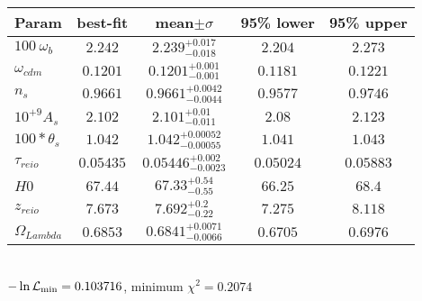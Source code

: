 \begin{tabular}{|l|c|c|c|c|} 
 \hline 
Param & best-fit & mean$\pm\sigma$ & 95\% lower & 95\% upper \\ \hline 
$100~\omega{}_{b }$ &$2.242$ & $2.239_{-0.018}^{+0.017}$ & $2.204$ & $2.273$ \\ 
$\omega{}_{cdm }$ &$0.1201$ & $0.1201_{-0.001}^{+0.001}$ & $0.1181$ & $0.1221$ \\ 
$n_{s }$ &$0.9661$ & $0.9661_{-0.0044}^{+0.0042}$ & $0.9577$ & $0.9746$ \\ 
$10^{+9}A_{s }$ &$2.102$ & $2.101_{-0.011}^{+0.01}$ & $2.08$ & $2.123$ \\ 
$100*\theta{}_{s }$ &$1.042$ & $1.042_{-0.00055}^{+0.00052}$ & $1.041$ & $1.043$ \\ 
$\tau{}_{reio }$ &$0.05435$ & $0.05446_{-0.0023}^{+0.002}$ & $0.05024$ & $0.05883$ \\ 
$H0$ &$67.44$ & $67.33_{-0.55}^{+0.54}$ & $66.25$ & $68.4$ \\ 
$z_{reio }$ &$7.673$ & $7.692_{-0.22}^{+0.2}$ & $7.275$ & $8.118$ \\ 
$\Omega{}_{Lambda }$ &$0.6853$ & $0.6841_{-0.0066}^{+0.0071}$ & $0.6705$ & $0.6976$ \\ 
\hline 
 \end{tabular} \\ 
$-\ln{\cal L}_\mathrm{min} =0.103716$, minimum $\chi^2=0.2074$ \\ 
